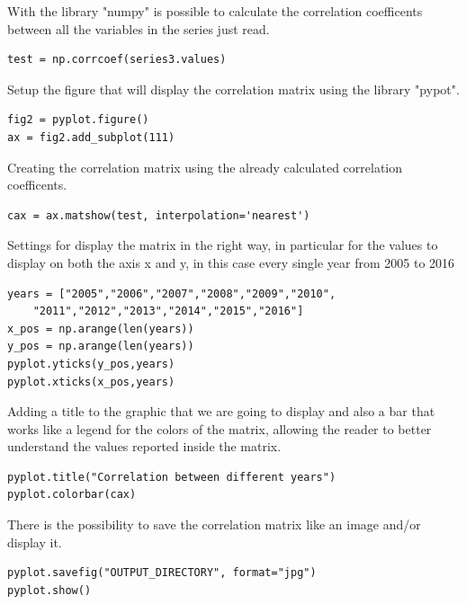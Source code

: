 With the library "numpy" is possible to calculate the correlation coefficents between all the variables in the series just read.
\begin{lstlisting}
test = np.corrcoef(series3.values)
\end{lstlisting}

Setup the figure that will display the correlation matrix using the library "pypot".
\begin{lstlisting}
fig2 = pyplot.figure()
ax = fig2.add_subplot(111)
\end{lstlisting}

Creating the correlation matrix using the already calculated correlation coefficents.
\begin{lstlisting}
cax = ax.matshow(test, interpolation='nearest')
\end{lstlisting}

Settings for display the matrix in the right way, in particular for the values to display on both the axis x and y, in this case every single year from 2005 to 2016
\begin{lstlisting}
years = ["2005","2006","2007","2008","2009","2010",
	"2011","2012","2013","2014","2015","2016"]
x_pos = np.arange(len(years))
y_pos = np.arange(len(years))
pyplot.yticks(y_pos,years)
pyplot.xticks(x_pos,years)
\end{lstlisting}
\newpage
Adding a title to the graphic that we are going to display and also a bar that works like a legend for the colors of the matrix, allowing the reader to better understand the values reported inside the matrix.
\begin{lstlisting}
pyplot.title("Correlation between different years")
pyplot.colorbar(cax)
\end{lstlisting}

There is the possibility to save the correlation matrix like an image and/or display it.
\begin{lstlisting}
pyplot.savefig("OUTPUT_DIRECTORY", format="jpg")
pyplot.show()
\end{lstlisting}

